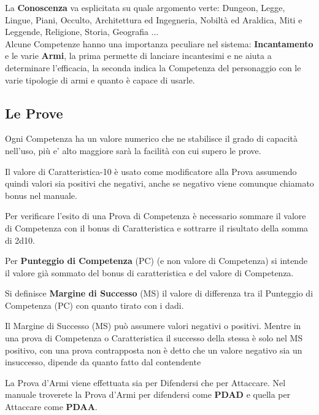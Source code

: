 \documentclass[12pt,a4paper,twoside,openany]{book}
\begin{document}
La \textbf{Conoscenza} va esplicitata su quale argomento verte: Dungeon, Legge, Lingue, Piani, Occulto, Architettura ed Ingegneria, Nobiltà ed Araldica, Miti e Leggende, Religione, Storia, Geografia ...\\

Alcune Competenze hanno una importanza peculiare nel sistema: \textbf{Incantamento} e le varie \textbf{Armi}, la prima permette di lanciare incantesimi e ne aiuta a determinare l'efficacia, la seconda indica la Competenza del personaggio con le varie tipologie di armi e quanto è capace di usarle.

\begin{multicols}{2}
	
\subsection{Le Prove}

Ogni Competenza ha un valore numerico che ne stabilisce il grado di capacità nell'uso, più e' alto maggiore sarà la facilità con cui supero le prove.

Il valore di Caratteristica-10 è usato come modificatore alla Prova assumendo quindi valori sia positivi che negativi, anche se negativo viene comunque chiamato bonus nel manuale.

Per verificare l'esito di una Prova di Competenza è necessario sommare il valore di Competenza con il bonus di Caratteristica e sottrarre il risultato della somma di 2d10.

Per \textbf{Punteggio di Competenza} (PC) (e non valore di Competenza) si intende il valore già sommato del bonus di caratteristica e del valore di Competenza.

Si definisce \textbf{Margine di Successo} (MS) il valore di differenza tra il Punteggio di Competenza (PC) con quanto tirato con i dadi.

Il Margine di Successo (MS) può assumere valori negativi o positivi. Mentre in una prova di Competenza o Caratteristica il successo della stessa è solo nel MS positivo, con una prova contrapposta non è detto che un valore negativo sia un insuccesso, dipende da quanto fatto dal contendente

La Prova d'Armi viene effettuata sia per Difendersi che per Attaccare. Nel manuale troverete la Prova d'Armi per difendersi come \textbf{PDAD} e quella per Attaccare come \textbf{PDAA}.
 

\end{multicols}
\end{document}
